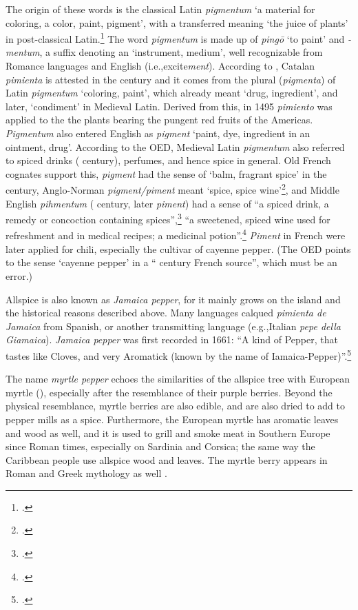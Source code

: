 The origin of these words is the classical Latin \textit{pigmentum} `a material for coloring, a color, paint, pigment', with a transferred meaning `the juice of plants' in post-classical Latin.\footcite[pigmentum ]{lewis_latin_1879} The word \textit{pigmentum} is made up of \textit{pingō} `to paint' and \textit{-mentum}, a suffix denoting an `instrument, medium', well recognizable from Romance languages and English (i.e.,excite\textit{ment}).
According to \textcite[459]{corominas_breve_1987}, Catalan \textit{pimienta} is attested in the  century and it comes from the plural (\textit{pigmenta}) of Latin \textit{pigmentum} `coloring, paint', which already meant `drug, ingredient', and later, `condiment' in Medieval Latin. Derived from this, in 1495 \textit{pimiento} was applied to the the plants bearing the pungent red fruits of the Americas. \textit{Pigmentum} also entered English as \textit{pigment} `paint, dye, ingredient in an ointment, drug'. According to the \gls{OED}, Medieval Latin \textit{pigmentum} also referred to spiced drinks ( century), perfumes, and hence spice in general. Old French cognates support this, \textit{pigment} had the sense of `balm, fragrant spice' in the  century, Anglo-Norman \textit{pigment/piment} meant `spice, spice wine'\footcite[pigment]{oed}, and Middle English \textit{pihmentum} ( century, later \textit{piment}) had a sense of ``a spiced drink, a remedy or concoction containing spices'',\footcite[pigment]{oe} ``a sweetened, spiced wine used for refreshment and in medical recipes; a medicinal potion''.\footcite[piment]{med} \textit{Piment} in French were later applied for chili, especially the cultivar of cayenne pepper. (The \gls{OED} points to the sense `cayenne pepper' in a `` century French source'', which must be an error.)


Allspice is also known as \textit{Jamaica pepper}, for it mainly grows on the island and the historical reasons described above. Many languages calqued \textit{pimienta de Jamaica} from Spanish, or another transmitting language (e.g.,Italian \textit{pepe della Giamaica}). \textit{Jamaica pepper} was first recorded in 1661: ``A kind of Pepper, that tastes like Cloves, and very Aromatick (known by the name of Iamaica-Pepper)''.\footcite[Jamaica]{oed}

The name \textit{myrtle pepper}  echoes the similarities of the allspice tree with European myrtle (), especially after the resemblance of their purple berries. Beyond the physical resemblance, myrtle berries are also edible, and are also dried to add to pepper mills as a spice. Furthermore, the European myrtle has aromatic leaves and wood as well, and it is used to grill and smoke meat in Southern Europe since Roman times, especially on Sardinia and Corsica; the same way the Caribbean people use allspice wood and leaves. The myrtle berry appears in Roman and Greek mythology as well \autocite[186]{van_wyk_culinary_2014}.

